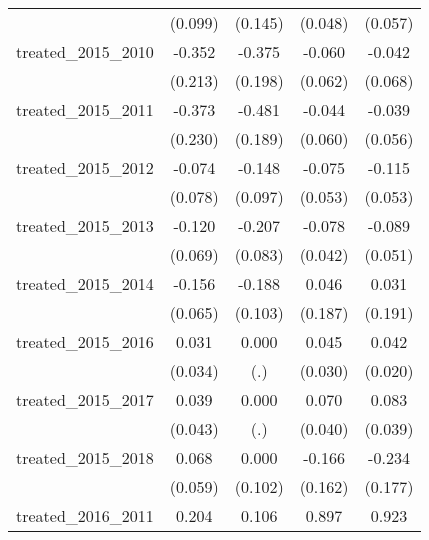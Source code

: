 {\begin{tabular}{l*{4}{c}}
            &     (0.099)         &     (0.145)         &     (0.048)         &     (0.057)         \\
[1em]
treated\_2015\_2010&      -0.352         &      -0.375         &      -0.060         &      -0.042         \\
            &     (0.213)         &     (0.198)         &     (0.062)         &     (0.068)         \\
[1em]
treated\_2015\_2011&      -0.373         &      -0.481\sym{*}  &      -0.044         &      -0.039         \\
            &     (0.230)         &     (0.189)         &     (0.060)         &     (0.056)         \\
[1em]
treated\_2015\_2012&      -0.074         &      -0.148         &      -0.075         &      -0.115\sym{*}  \\
            &     (0.078)         &     (0.097)         &     (0.053)         &     (0.053)         \\
[1em]
treated\_2015\_2013&      -0.120         &      -0.207\sym{*}  &      -0.078         &      -0.089         \\
            &     (0.069)         &     (0.083)         &     (0.042)         &     (0.051)         \\
[1em]
treated\_2015\_2014&      -0.156\sym{*}  &      -0.188         &       0.046         &       0.031         \\
            &     (0.065)         &     (0.103)         &     (0.187)         &     (0.191)         \\
[1em]
treated\_2015\_2016&       0.031         &       0.000         &       0.045         &       0.042\sym{*}  \\
            &     (0.034)         &         (.)         &     (0.030)         &     (0.020)         \\
[1em]
treated\_2015\_2017&       0.039         &       0.000         &       0.070         &       0.083\sym{*}  \\
            &     (0.043)         &         (.)         &     (0.040)         &     (0.039)         \\
[1em]
treated\_2015\_2018&       0.068         &       0.000         &      -0.166         &      -0.234         \\
            &     (0.059)         &     (0.102)         &     (0.162)         &     (0.177)         \\
[1em]
treated\_2016\_2011&       0.204         &       0.106         &       0.897\sym{***}&       0.923\sym{***}\\

\end{tabular}}
